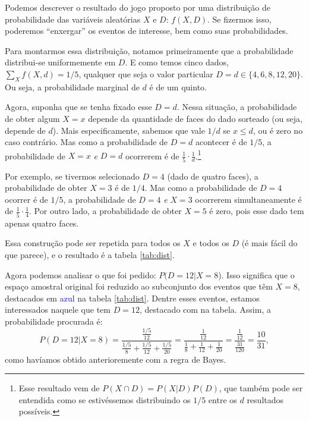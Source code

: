 \begin{question}
\begin{solution}
    Podemos descrever o resultado do jogo proposto por uma distribuição de probabilidade das variáveis aleatórias $X$ e $D$: $f(X,D)$.
    Se fizermos isso, poderemos ``enxergar'' os eventos de interesse, bem como suas probabilidades.

    Para montarmos essa distribuição, notamos primeiramente que a probabilidade distribui-se uniformemente em $D$.
    E como temos cinco dados, $\sum_X f(X,d) = 1/5$, qualquer que seja o valor particular $D = d \in \{4,6,8,12,20\}$.
    Ou seja, a probabilidade marginal de $d$ é de um quinto.

    Agora, suponha que se tenha fixado esse $D = d$.
    Nessa situação, a probabilidade de obter algum $X = x$ depende da quantidade de faces do dado sorteado (ou seja, depende de $d$).
    Mais especificamente, sabemos que vale $1/d$ se $x \le d$, ou é zero no caso contrário.
    Mas como a probabilidade de $D = d$ acontecer é de $1/5$, a probabilidade de $X = x$ \emph{e} $D = d$ ocorrerem é de $\frac{1}{5}\cdot\frac{1}{d}$.\footnote{Esse resultado vem de $P(X \cap D) = P(X|D)P(D)$, que também pode ser entendida como se estivéssemos distribuindo os $1/5$ entre os $d$ resultados possíveis.}

    Por exemplo, se tivermos selecionado $D = 4$ (dado de quatro faces), a probabilidade de obter $X = 3$ é de $1/4$.
    Mas como a probabilidade de $D = 4$ ocorrer é de $1/5$, a probabilidade de $D = 4$ \emph{e} $X = 3$ ocorrerem simultaneamente é de $\frac{1}{5}\cdot\frac{1}{4}$.
    Por outro lado, a probabilidade de obter $X = 5$ é zero, pois esse dado tem apenas quatro faces.

    Essa construção pode ser repetida para todos os $X$ e todos os $D$ (é mais fácil do que parece), e o resultado é a tabela \ref{tab:dist}.

    Agora podemos analisar o que foi pedido: $P(D=12|X=8$).
    Isso significa que o espaço amostral original foi reduzido ao subconjunto dos eventos que têm $X = 8$, destacados em \textcolor{blue}{azul} na tabela \ref{tab:dist}.
    Dentre esses eventos, estamos interessados naquele que tem $D = 12$, destacado com  na tabela.
    Assim, a probabilidade procurada é:
    \begin{equation*}
      P(D=12|X=8) = \frac{\frac{1/5}{12}}{\frac{1/5}{8} + \frac{1/5}{12} + \frac{1/5}{20}}
        = \frac{\frac{1}{12}}{\frac{1}{8} + \frac{1}{12} + \frac{1}{20}} = \frac{\frac{1}{12}}{\frac{31}{120}}
        = \frac{10}{31},
    \end{equation*}
    como havíamos obtido anterioremente com a regra de Bayes.


\end{solution}
\end{question}
